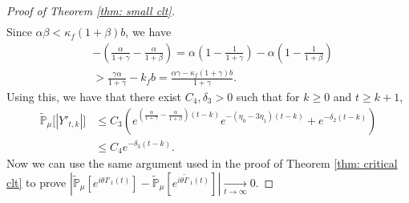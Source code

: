 \documentclass[12pt,a4paper]{amsart}
\theoremstyle{plain}
\theoremstyle{definition}
\numberwithin{equation}{section}
\begin{document}
\begin{proof}[Proof of Theorem \ref{thm: small clt}]
\begin{align}
\end{align}
    Since $\alpha\beta<\kappa_f(1+\beta)b$,  we have
\begin{align}
\label{eq: condition for supercritical}
	&-(\frac{\alpha}{1+\gamma}-\frac{\alpha}{1+\beta})
    = \alpha(1-\frac{1}{1+\gamma}) - \alpha(1-\frac{1}{1+\beta})
    \\&> \frac{\gamma \alpha}{1+\gamma} - k_f b
    =\frac{\alpha \gamma-\kappa_f(1+\gamma)b}{1+\gamma}.
\end{align}
Using this, we have that there exist $C_4,
    \delta_3 > 0$ such that for $k\geq 0$ and $t\geq k+1$,
\begin{align}
    \mathbb{\widetilde{P}}_{\mu}\big[|Y'_{t,k}|\big]
    & \leq C_3( e^{(\frac{\alpha}{1+\gamma} - \frac{\alpha}{1+\beta})(t-k)}e^{-(\eta_0 - 3\eta_1)(t-k)}+ e^{-\delta_2(t-k)})
    \\& \leq C_4e^{-\delta_3 (t-k)}.
\end{align}
    Now we can  use the  same argument used in the proof of Theorem \ref{thm: critical clt} to prove $|\mathbb{\widetilde{P}}_{\mu}[e^{i\theta I'_1(t)}]-\mathbb{\widetilde{P}}_{\mu}[e^{i\theta\widetilde I'_1(t)}]|\xrightarrow[t\to \infty]{} 0$.


\end{proof}
\end{document}
